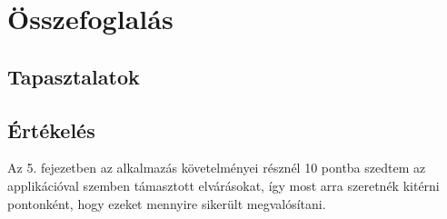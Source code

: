 \chapter{Összefoglalás}


\section{Tapasztalatok}

\section{Értékelés}

Az 5. fejezetben az alkalmazás követelményei résznél 10 pontba szedtem az applikációval szemben támasztott elvárásokat, így most arra szeretnék kitérni pontonként, hogy ezeket mennyire sikerült megvalósítani.

